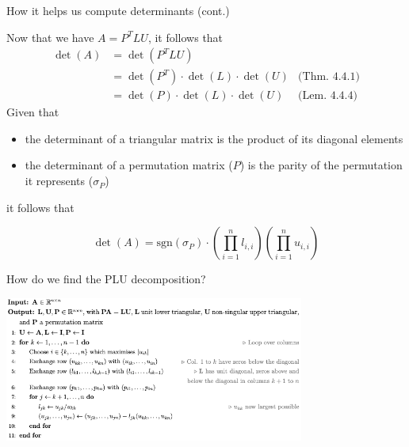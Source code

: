\documentclass{beamer}
\begin{document}
\begin{frame}{How it helps us compute determinants (cont.)}

    Now that we have $A=P^T LU$, it follows that
    \begin{align*}
        \det(A)  & = \det(P^T L U) & \\
                 & = \det(P^T)\cdot \det(L)\cdot \det(U) & \text{(Thm. 4.4.1)} \\
                 & = \det(P)\cdot \det(L)\cdot \det(U)   & \text{(Lem. 4.4.4)}
    \end{align*}
    Given that
    \begin{itemize}
        \item the determinant of a triangular matrix is the product of its diagonal elements
        \item the determinant of a permutation matrix ($P$) is the parity of the permutation
            it represents ($\sigma_P$)
    \end{itemize}
    it follows that
    \begin{block}{}
        \[
            \det(A) = \text{sgn}(\sigma_P) \cdot \left( \prod_{i=1}^{n} l_{i,i} \right)
            \left( \prod_{i=1}^{n} u_{i,i} \right)
        \]
    \end{block}

\end{frame}

\begin{frame}{How do we find the PLU decomposition?}
    \begin{center}{}
        \includegraphics[height=180]{PLUcode.png}
    \end{center}


\end{frame}
\end{document}
